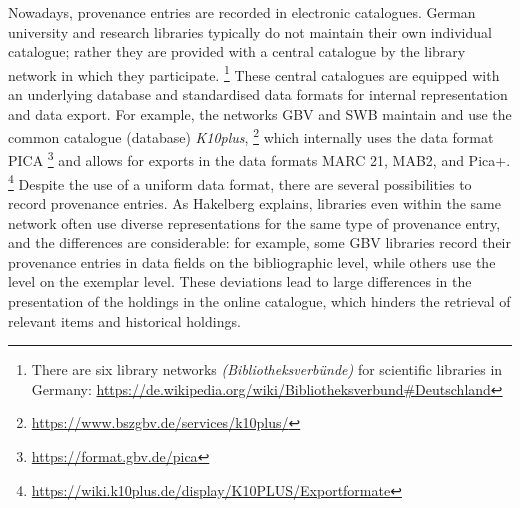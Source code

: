 Nowadays, provenance entries are recorded in electronic catalogues.
German university and research libraries typically do not 
maintain their own individual catalogue; rather they are provided with a central
catalogue by the library network in which they participate.%
\footnote{%
  There are six library networks \emph{(Bibliotheksverbünde)} for scientific libraries
  in Germany: \url{https://de.wikipedia.org/wiki/Bibliotheksverbund\#Deutschland}%
}
These central catalogues are equipped with an underlying database
and standardised data formats for internal representation and data export.
For example, the networks GBV and SWB maintain and use the common catalogue (database)
\emph{K10plus},%
\footnote{\url{https://www.bszgbv.de/services/k10plus/}}
which internally uses the data format PICA%
\footnote{\url{https://format.gbv.de/pica}}
and allows for exports in the data formats
MARC 21, MAB2, and Pica+.%
\footnote{\url{https://wiki.k10plus.de/display/K10PLUS/Exportformate}}
Despite the use of a uniform data format,
there are several possibilities to record provenance entries.
As Hakelberg \autocite*[Chapter~4]{Hakelberg2016} explains,
libraries even within the same network often use diverse representations
for the same type of provenance entry, and the differences are considerable:
for example, some GBV libraries record their provenance entries
in data fields on the bibliographic level,
while others use the level on the exemplar level.
These deviations lead to large differences in the presentation
of the holdings in the online catalogue,
which hinders the retrieval of relevant items and historical holdings.

